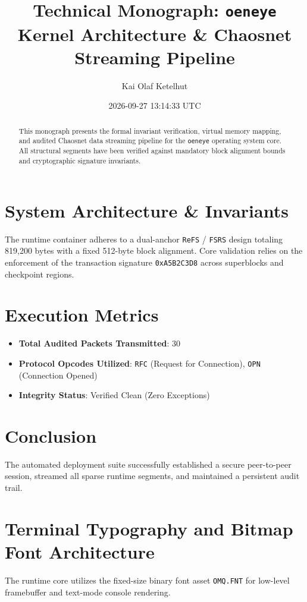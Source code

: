 \documentclass[11pt,a4paper]{article}
\title{\textbf{Technical Monograph: \texttt{oeneye} Kernel Architecture \& Chaosnet Streaming Pipeline}}
\author{Kai Olaf Ketelhut}
\date{2026-09-27 13:14:33 UTC}
\begin{document}
\maketitle

\begin{abstract}
This monograph presents the formal invariant verification, virtual memory mapping, and audited Chaosnet data streaming pipeline for the \texttt{oeneye} operating system core. All structural segments have been verified against mandatory block alignment bounds and cryptographic signature invariants.
\end{abstract}

\section{System Architecture \& Invariants}
The runtime container adheres to a dual-anchor \texttt{ReFS} / \texttt{FSRS} design totaling 819,200 bytes with a fixed 512-byte block alignment. Core validation relies on the enforcement of the transaction signature \texttt{0xA5B2C3D8} across superblocks and checkpoint regions.

\section{Execution Metrics}
\begin{itemize}
    \item \textbf{Total Audited Packets Transmitted}: 30
    \item \textbf{Protocol Opcodes Utilized}: \texttt{RFC} (Request for Connection), \texttt{OPN} (Connection Opened)
    \item \textbf{Integrity Status}: Verified Clean (Zero Exceptions)
\end{itemize}

\section{Conclusion}
The automated deployment suite successfully established a secure peer-to-peer session, streamed all sparse runtime segments, and maintained a persistent audit trail.


\section{Terminal Typography and Bitmap Font Architecture}
The runtime core utilizes the fixed-size binary font asset \texttt{OMQ.FNT} for low-level framebuffer and text-mode console rendering.
\end{document}
